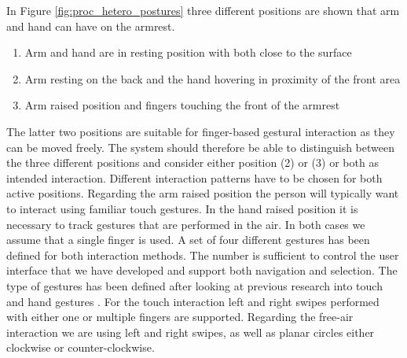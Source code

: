 In Figure \ref{fig:proc_hetero_postures} three different positions are shown that arm and hand can have on the armrest. 
\begin{enumerate}
\item Arm and hand are in resting position with both close to the surface
\item Arm resting on the back and the hand hovering in proximity of the front area
\item Arm raised position and fingers touching the front of the armrest
\end{enumerate}
The latter two positions are suitable for finger-based gestural interaction as they can be moved freely. The system should therefore be able to distinguish between the three different positions and consider either position (2) or (3) or both as intended interaction. Different interaction patterns have to be chosen for both active positions. Regarding the arm raised position the person will typically want to interact using familiar touch gestures. In the hand raised position it is necessary to track gestures that are performed in the air. In both cases we assume that a single finger is used. A set of four different gestures has been defined for both interaction methods. The number is sufficient to control the user interface that we have developed and support both navigation and selection. The type of gestures has been defined after looking at previous research into touch and hand gestures \cite{bragdon2011experimental, wachs2011vision}. For the touch interaction left and right swipes performed with either one or multiple fingers are supported. Regarding the free-air interaction we are using left and right swipes, as well as planar circles either clockwise or counter-clockwise. 
 
